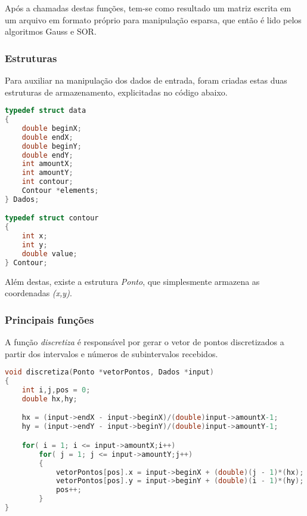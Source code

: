 \documentclass[
	11pt,				%
	oneside,			%
	a4paper,			%
	english,			%
	brazil,				%
	]{article}
\begin{document}
Após a chamadas destas funções, tem-se como resultado um matriz escrita em um arquivo em formato próprio para manipulação esparsa, que então é lido pelos algoritmos Gauss e SOR.

\subsubsection{Estruturas}
Para auxiliar na manipulação dos dados de entrada, foram criadas estas duas estruturas de armazenamento, explicitadas no código abaixo.

\begin{lstlisting}[language=C, caption=Estruturas de entrada]
typedef struct data
{
	double beginX;
	double endX;
	double beginY;
	double endY;
	int amountX;
	int amountY;
	int contour;
	Contour *elements;
} Dados;

typedef struct contour
{
	int x;
	int y;
	double value;
} Contour;
\end{lstlisting}

Além destas, existe a estrutura \textit{Ponto}, que simplesmente armazena as coordenadas \textit{(x,y)}.

\subsubsection{Principais funções}

A função \textit{discretiza} é responsável por gerar o vetor de pontos discretizados a partir dos intervalos e números de subintervalos recebidos.
\begin{lstlisting}[language=C, caption=Função Discretiza]
void discretiza(Ponto *vetorPontos, Dados *input)
{
	int i,j,pos = 0;
	double hx,hy;

	hx = (input->endX - input->beginX)/(double)input->amountX-1;
	hy = (input->endY - input->beginY)/(double)input->amountY-1;

	for( i = 1; i <= input->amountX;i++)
		for( j = 1; j <= input->amountY;j++)
		{
			vetorPontos[pos].x = input->beginX + (double)(j - 1)*(hx);
			vetorPontos[pos].y = input->beginY + (double)(i - 1)*(hy);
			pos++;
		}
}
\end{lstlisting}
\end{document}
